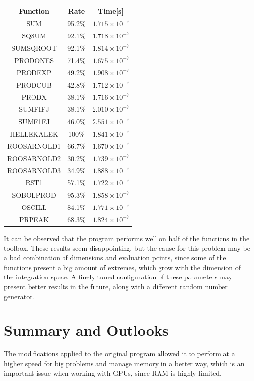 \documentclass[english]{maciarticle}
\begin{document}
\begin{center}
	\begin{tabular}{ccc}
		\hline
		Function & Rate & Time[s] \\
		\hline
				SUM & 95.2\% & $1.715 \times 10^{-9}$\\
				SQSUM & 92.1\% & $1.718 \times 10^{-9}$\\
				SUMSQROOT & 92.1\% & $1.814 \times 10^{-9}$\\
				PRODONES & 71.4\% & $1.675 \times 10^{-9}$\\
				PRODEXP & 49.2\% & $1.908 \times 10^{-9}$\\
				PRODCUB & 42.8\% & $1.712 \times 10^{-9}$\\
				PRODX & 38.1\% & $1.716 \times 10^{-9}$\\
				SUMFIFJ & 38.1\% & $2.010 \times 10^{-9}$\\
				SUMF1FJ & 46.0\% & $2.551 \times 10^{-9}$\\
				HELLEKALEK & 100\% & $1.841 \times 10^{-9}$\\
				ROOSARNOLD1 & 66.7\% & $1.670 \times 10^{-9}$\\
				ROOSARNOLD2 & 30.2\% & $1.739 \times 10^{-9}$\\
				ROOSARNOLD3 & 34.9\% & $1.888 \times 10^{-9}$\\
				RST1 & 57.1\% & $1.722 \times 10^{-9}$\\
				SOBOLPROD & 95.3\% & $1.858 \times 10^{-9}$\\
				OSCILL & 84.1\% & $1.771 \times 10^{-9}$\\
				PRPEAK & 68.3\% & $1.824 \times 10^{-9}$\\
		
	\end{tabular}
\end{center}

It can be observed that the program performs well on half of the functions in the toolbox. These results seem disappointing, but the cause for this problem may be a bad combination of dimensions and evaluation points, since some of the functions present a big amount of extremes, which grow with the dimension of the integration space. A finely tuned configuration of these parameters may present better results in the future, along with a different random number generator.


\section{Summary and Outlooks}
The modifications applied to the original program allowed it to perform at a higher speed for big problems and manage memory in a better way, which is an important issue when working with GPUs, since RAM is highly limited.
\end{document}
